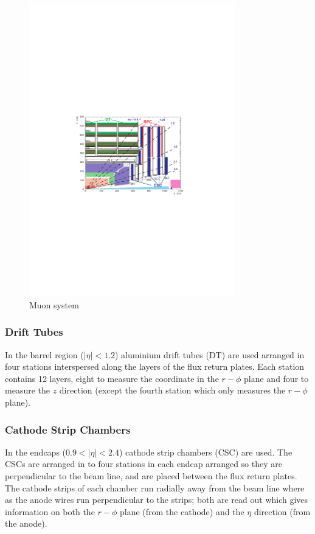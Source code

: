 \begin{figure}[ht]
  \centering
  \includegraphics[width=0.8\textwidth]{muon_system}
  \caption{Muon system}
  \label{fig:muon_system}
\end{figure}

\subsubsection{Drift Tubes}
In the barrel region ($|\eta| < 1.2$) aluminium drift tubes (DT) are used
arranged in four stations interspersed along the layers of the flux return
plates. 
Each station contains 12 layers, eight to measure the coordinate in the
$r-\phi$ plane and four to measure the $z$ direction (except the fourth station
which only measures the $r-\phi$ plane). 

\subsubsection{Cathode Strip Chambers}
In the endcaps ($0.9<|\eta|<2.4$) cathode strip chambers (CSC) are used. The
CSCs are arranged in to four stations in each endcap arranged so they are
perpendicular to the beam line, and are placed between the flux return plates.
The cathode strips of each chamber run radially away from the beam line where
as the anode wires run perpendicular to the strips; both are read out which
gives information on both the $r-\phi$ plane (from the cathode) and the $\eta$
direction (from the anode). \cite{cms}

